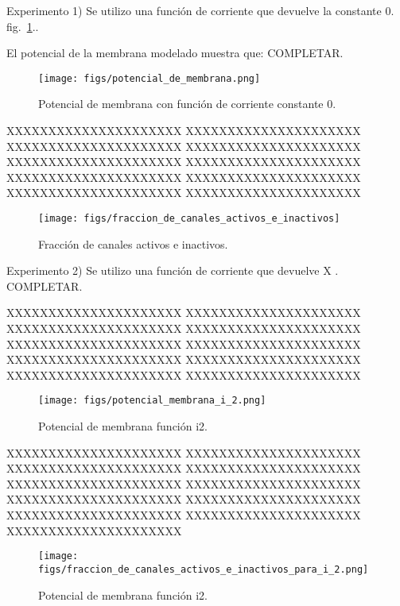 \documentclass[aps,prl,twocolumn,groupedaddress]{revtex4-2}
\begin{document}
Experimento 1) Se utilizo una función de corriente que devuelve la constante 0. fig.~\ref{fig1}..


El potencial de la membrana modelado muestra que:
 COMPLETAR.

\begin{figure}[h!]
\centering
\texttt{[image: figs/potencial\_de\_membrana.png]}
\caption{Potencial de membrana con función de corriente constante 0. \label{fig1}}
\end{figure}


XXXXXXXXXXXXXXXXXXXXX
XXXXXXXXXXXXXXXXXXXXX
XXXXXXXXXXXXXXXXXXXXX
XXXXXXXXXXXXXXXXXXXXX
XXXXXXXXXXXXXXXXXXXXX
XXXXXXXXXXXXXXXXXXXXX
XXXXXXXXXXXXXXXXXXXXX
XXXXXXXXXXXXXXXXXXXXX
XXXXXXXXXXXXXXXXXXXXX
XXXXXXXXXXXXXXXXXXXXX


\begin{figure}[h!]
\centering
\texttt{[image: figs/fraccion\_de\_canales\_activos\_e\_inactivos]}
\caption{Fracción de canales activos e inactivos. \label{fig2}}
\end{figure}


Experimento 2) Se utilizo una función de corriente que devuelve X
. COMPLETAR.

XXXXXXXXXXXXXXXXXXXXX
XXXXXXXXXXXXXXXXXXXXX
XXXXXXXXXXXXXXXXXXXXX
XXXXXXXXXXXXXXXXXXXXX
XXXXXXXXXXXXXXXXXXXXX
XXXXXXXXXXXXXXXXXXXXX
XXXXXXXXXXXXXXXXXXXXX
XXXXXXXXXXXXXXXXXXXXX
XXXXXXXXXXXXXXXXXXXXX
XXXXXXXXXXXXXXXXXXXXX


\begin{figure}[h!]
\centering
\texttt{[image: figs/potencial\_membrana\_i\_2.png]}
\caption{Potencial de membrana función i2. \label{fig3}}
\end{figure}


XXXXXXXXXXXXXXXXXXXXX
XXXXXXXXXXXXXXXXXXXXX
XXXXXXXXXXXXXXXXXXXXX
XXXXXXXXXXXXXXXXXXXXX
XXXXXXXXXXXXXXXXXXXXX
XXXXXXXXXXXXXXXXXXXXX
XXXXXXXXXXXXXXXXXXXXX
XXXXXXXXXXXXXXXXXXXXX
XXXXXXXXXXXXXXXXXXXXX
XXXXXXXXXXXXXXXXXXXXX
XXXXXXXXXXXXXXXXXXXXX


\begin{figure}[h!]
\centering
\texttt{[image: figs/fraccion\_de\_canales\_activos\_e\_inactivos\_para\_i\_2.png]}
\caption{Potencial de membrana función i2. \label{fig4}}
\end{figure}
\end{document}
